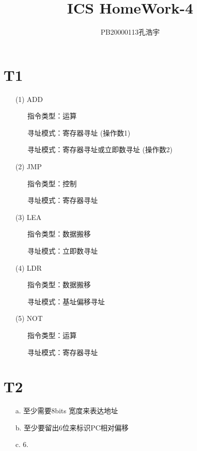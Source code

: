 \documentclass{article}
\title{ICS  HomeWork-4}
\author{PB20000113孔浩宇}
\begin{document}
\maketitle
\section*{T1}
\begin{enumerate}
    \item [(1)]ADD
    \begin{enumerate}
        \item []指令类型：运算
        \item []寻址模式：寄存器寻址 (操作数1)
        \item []寻址模式：寄存器寻址或立即数寻址 (操作数2)
    \end{enumerate}
    \item [(2)]JMP
    \begin{enumerate}
        \item []指令类型：控制
        \item []寻址模式：寄存器寻址
    \end{enumerate}
    \item [(3)]LEA
    \begin{enumerate}
        \item []指令类型：数据搬移
        \item []寻址模式：立即数寻址
    \end{enumerate}
    \item [(4)]LDR
    \begin{enumerate}
        \item []指令类型：数据搬移
        \item []寻址模式：基址偏移寻址
    \end{enumerate}
    \item [(5)]NOT
    \begin{enumerate}
        \item []指令类型：运算
        \item []寻址模式：寄存器寻址
    \end{enumerate}
\end{enumerate}

\section*{T2}
    \begin{enumerate}
        \item [a.]至少需要8bits 宽度来表达地址
        \item [b.]至少要留出6位来标识PC相对偏移
        \item [c.]6.
    \end{enumerate}
\end{document}
